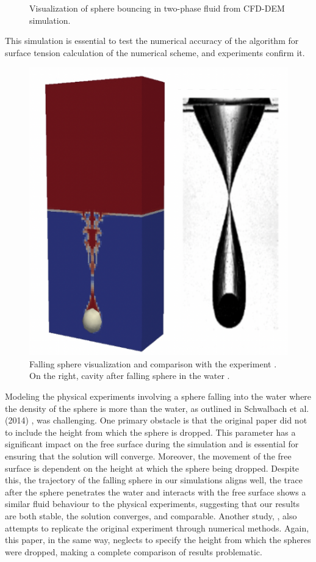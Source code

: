 \begin{figure}[H]
\begin{minipage}{.4\textwidth}
    \end{minipage}
    \caption{Visualization of sphere bouncing in two-phase fluid from CFD-DEM simulation.}
    \label{fig:two-phase_sphere}
\end{figure}


This simulation is essential to test the numerical accuracy of the algorithm for surface tension calculation of the numerical scheme, and experiments confirm it.

 \begin{figure}[!ht]
    \centering
    \includegraphics[width=12cm]{Images/chap3/cavityIB.png}
    \caption{Falling sphere visualization and comparison with the experiment \cite{schwalbach}. On the right, cavity after falling sphere in the water \cite{schwalbach}.}
    \label{fig:IB}
\end{figure}
Modeling the physical experiments involving a sphere falling into the water where the density of the sphere is more than the water, as outlined in Schwalbach et al. (2014) \cite{schwalbach}, was challenging. One primary obstacle is that the original paper did not to include the height from which the sphere is dropped. This parameter has a significant impact on the free surface during the simulation and is essential for ensuring that the solution will converge. Moreover, the movement of the free surface is dependent on the height at which the sphere being dropped. Despite this, the trajectory of the falling sphere in our simulations aligns well, the trace after the sphere penetrates the water and interacts with the free surface shows a similar fluid behaviour to the physical experiments, suggesting that our results are both stable, the solution converges, and comparable. Another study, \cite{shen2022resolved}, also attempts to replicate the original experiment through numerical methods. Again, this paper, in the same way, neglects to specify the height from which the spheres were dropped, making a complete comparison of results problematic.

